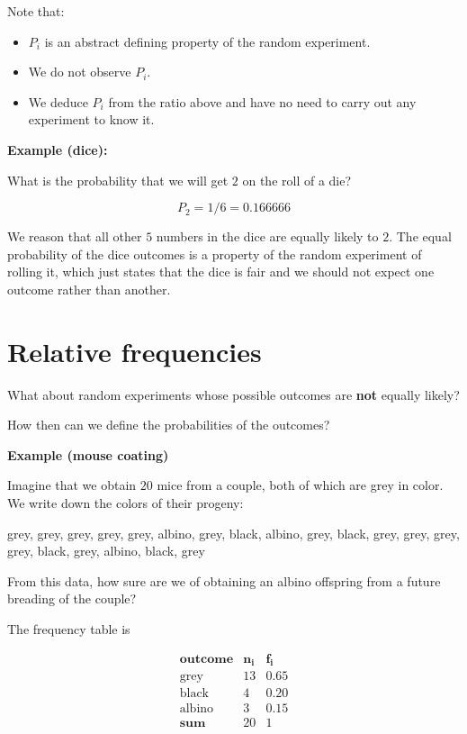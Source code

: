 \documentclass[
]{book}
\providecommand{\tightlist}{%
  \setlength{\itemsep}{0pt}\setlength{\parskip}{0pt}}
\begin{document}
Note that:

\begin{itemize}
\tightlist
\item
  \(P_i\) is an abstract defining property of the random experiment.
\item
  We do not observe \(P_i\).
\item
  We deduce \(P_i\) from the ratio above and have no need to carry out any experiment to know it.
\end{itemize}

\textbf{Example (dice):}

What is the probability that we will get \(2\) on the roll of a die?

\[P_2=1/6=0.166666\]

We reason that all other \(5\) numbers in the dice are equally likely to \(2\). The equal probability of the dice outcomes is a property of the random experiment of rolling it, which just states that the dice is fair and we should not expect one outcome rather than another.

\hypertarget{relative-frequencies-1}{%
\section{Relative frequencies}\label{relative-frequencies-1}}

What about random experiments whose possible outcomes are \textbf{not} equally likely?

How then can we define the probabilities of the outcomes?

\textbf{Example (mouse coating)}

Imagine that we obtain \(20\) mice from a couple, both of which are grey in color. We write down the colors of their progeny:

grey, grey, grey, grey, grey, albino, grey, black, albino, grey, black, grey, grey, grey, grey, black, grey, albino, black, grey

From this data, how sure are we of obtaining an albino offspring from a future breading of the couple?

The frequency table is

\[
\begin{array}{ccc}
\mathbf{outcome} & \mathbf{n_i} & \mathbf{f_i} \\
\text{grey}  & 13    & 0.65  \\
\text{black}   & 4     & 0.20  \\ 
\text{albino}  & 3     & 0.15  \\ \hline
\mathbf{sum} & 20 & 1
\end{array}
\]
\end{document}
